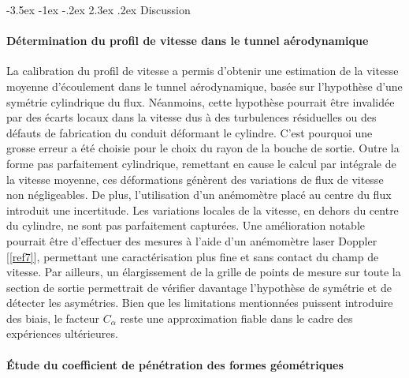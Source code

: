 \documentclass[a4paper, 12pt,oneside]{article}
\makeatletter
\renewcommand{\section}{\@startsection {section}{1}{\z@}%
             {-3.5ex \@plus -1ex \@minus -.2ex}%
             {2.3ex \@plus.2ex}%
             {\normalfont\normalsize\bfseries}}
\makeatother
\begin{document}
\section{Discussion}

\paragraph{Détermination du profil de vitesse dans le tunnel aérodynamique}

La calibration du profil de vitesse a permis d’obtenir une estimation de la vitesse moyenne d’écoulement dans le tunnel aérodynamique, basée sur l’hypothèse d’une symétrie cylindrique du flux. Néanmoins, cette hypothèse pourrait être invalidée par des écarts locaux dans la vitesse dus à des turbulences résiduelles ou des défauts de fabrication du conduit déformant le cylindre. C'est pourquoi une grosse erreur a été choisie pour le choix du rayon de la bouche de sortie. Outre la forme pas parfaitement cylindrique, remettant en cause le calcul par intégrale de la vitesse moyenne, ces déformations génèrent des variations de flux de vitesse non négligeables. De plus, l’utilisation d’un anémomètre placé au centre du flux introduit une incertitude. Les variations locales de la vitesse, en dehors du centre du cylindre, ne sont pas parfaitement capturées. Une amélioration notable pourrait être d’effectuer des mesures à l’aide d’un anémomètre laser Doppler [\ref{ref7}], permettant une caractérisation plus fine et sans contact du champ de vitesse. Par ailleurs, un élargissement de la grille de points de mesure sur toute la section de sortie permettrait de vérifier davantage l’hypothèse de symétrie et de détecter les asymétries. Bien que les limitations mentionnées puissent introduire des biais, le facteur \(C_\alpha\) reste une approximation fiable dans le cadre des expériences ultérieures.

\paragraph{Étude du coefficient de pénétration des formes géométriques}
\end{document}
